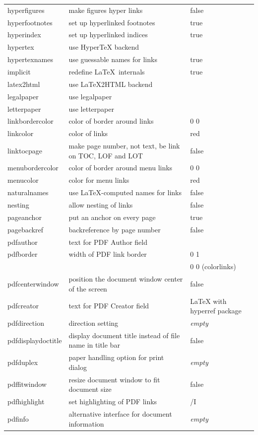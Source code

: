 \documentclass[a4paper,11pt]{article}
\newcommand{\optempty}{{\rmfamily\textit{empty}}}
\newcommand*{\for}[1]{{\rmfamily(#1)}}
\begin{document}
\begin{longtable}{@{}>{\ttfamily}lp{70mm}>{\ttfamily}l@{}}
hyperfigures &make figures hyper links&false\\
hyperfootnotes &set up hyperlinked footnotes&true\\
hyperindex &set up hyperlinked indices&true\\
hypertex &use HyperTeX backend\\
hypertexnames &use guessable names for links&true\\
implicit &redefine \LaTeX\ internals&true\\
latex2html &use \LaTeX2HTML backend\\
legalpaper &use legalpaper\\
letterpaper &use letterpaper\\
linkbordercolor &color of border around links& 1 0 0\\
linkcolor &color of links&red\\
linktocpage &make page number, not text, be link on TOC, LOF and LOT&false\\
menubordercolor &color of border around menu links& 1 0 0\\
menucolor &color for menu links&red\\
naturalnames &use \LaTeX-computed names for links&false\\
nesting &allow nesting of links&false\\
pageanchor &put an anchor on every page&true\\
pagebackref &backreference by page number&false\\
pdfauthor &text for PDF Author field&\optempty\\
pdfborder &width of PDF link border&0 0 1\\
&&0 0 0 \for{colorlinks}\\
pdfcenterwindow &position the document window center of the screen&false\\
pdfcreator &text for PDF Creator field&LaTeX with hyperref package\\
pdfdirection & direction setting & \optempty\\
pdfdisplaydoctitle &display document title instead of file name in title bar&false\\
pdfduplex &paper handling option for print dialog& \optempty\\
pdffitwindow &resize document window to fit document size&false\\
pdfhighlight &set highlighting of PDF links& /I\\
pdfinfo & alternative interface for document information & \optempty\\

\end{longtable}
\end{document}
